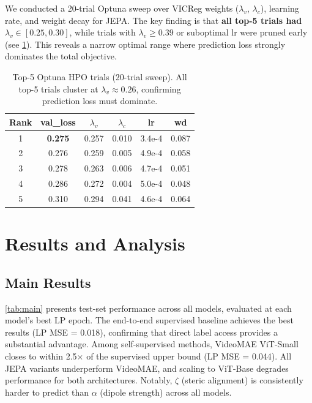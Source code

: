 \documentclass{article}
\begin{document}
We conducted a 20-trial Optuna sweep over VICReg weights ($\lambda_v$, $\lambda_c$), learning rate, and weight decay for JEPA. The key finding is that \textbf{all top-5 trials had $\lambda_v \in [0.25, 0.30]$}, while trials with $\lambda_v \geq 0.39$ or suboptimal lr were pruned early (see \cref{tab:hpo}). This reveals a narrow optimal range where prediction loss strongly dominates the total objective.

\begin{table}[t]
\caption{Top-5 Optuna HPO trials (20-trial sweep). All top-5 trials cluster at $\lambda_v \approx 0.26$, confirming prediction loss must dominate.}
\label{tab:hpo}
\vskip 0.1in
\centering
\small
\begin{tabular}{@{}cccccc@{}}
\toprule
Rank & val\_loss & $\lambda_v$ & $\lambda_c$ & lr & wd \\
\midrule
1 & \textbf{0.275} & 0.257 & 0.010 & 3.4e-4 & 0.087 \\
2 & 0.276 & 0.259 & 0.005 & 4.9e-4 & 0.058 \\
3 & 0.278 & 0.263 & 0.006 & 4.7e-4 & 0.051 \\
4 & 0.286 & 0.272 & 0.004 & 5.0e-4 & 0.048 \\
5 & 0.310 & 0.294 & 0.041 & 4.6e-4 & 0.064 \\
\bottomrule
\end{tabular}
\vskip -0.1in
\end{table}

\section{Results and Analysis}

\subsection{Main Results}

\cref{tab:main} presents test-set performance across all models, evaluated at each model's best LP epoch. The end-to-end supervised baseline achieves the best results (LP MSE = 0.018), confirming that direct label access provides a substantial advantage. Among self-supervised methods, VideoMAE ViT-Small closes to within 2.5$\times$ of the supervised upper bound (LP MSE = 0.044). All JEPA variants underperform VideoMAE, and scaling to ViT-Base degrades performance for both architectures. Notably, $\zeta$ (steric alignment) is consistently harder to predict than $\alpha$ (dipole strength) across all models.
\end{document}
